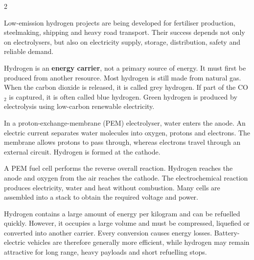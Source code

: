 

\begin{multicols}{2}
\begin{engineeringnews}
Low-emission hydrogen projects are being developed for fertiliser production, steelmaking, shipping and heavy road transport. Their success depends not only on electrolysers, but also on electricity supply, storage, distribution, safety and reliable demand.
\end{engineeringnews}

\begin{ecarticle}
Hydrogen is an \textbf{energy carrier}, not a primary source of energy. It must first be produced from another resource. Most hydrogen is still made from natural gas. When the carbon dioxide is released, it is called grey hydrogen. If part of the CO$_2$ is captured, it is often called blue hydrogen. Green hydrogen is produced by electrolysis using low-carbon renewable electricity.

In a proton-exchange-membrane (PEM) electrolyser, water enters the anode. An electric current separates water molecules into oxygen, protons and electrons. The membrane allows protons to pass through, whereas electrons travel through an external circuit. Hydrogen is formed at the cathode.

A PEM fuel cell performs the reverse overall reaction. Hydrogen reaches the anode and oxygen from the air reaches the cathode. The electrochemical reaction produces electricity, water and heat without combustion. Many cells are assembled into a stack to obtain the required voltage and power.

Hydrogen contains a large amount of energy per kilogram and can be refuelled quickly. However, it occupies a large volume and must be compressed, liquefied or converted into another carrier. Every conversion causes energy losses. Battery-electric vehicles are therefore generally more efficient, while hydrogen may remain attractive for long range, heavy payloads and short refuelling stops.
\end{ecarticle}


\end{multicols}

